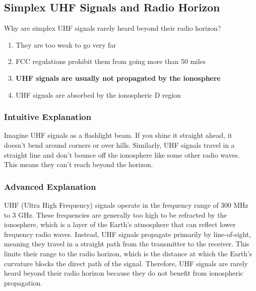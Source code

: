 \subsection{Simplex UHF Signals and Radio Horizon}
\label{T3C01}

\begin{tcolorbox}[colback=gray!10!white,colframe=black!75!black,title=T3C01]
Why are simplex UHF signals rarely heard beyond their radio horizon?
\begin{enumerate}[noitemsep]
    \item They are too weak to go very far
    \item FCC regulations prohibit them from going more than 50 miles
    \item \textbf{UHF signals are usually not propagated by the ionosphere}
    \item UHF signals are absorbed by the ionospheric D region
\end{enumerate}
\end{tcolorbox}

\subsubsection*{Intuitive Explanation}
Imagine UHF signals as a flashlight beam. If you shine it straight ahead, it doesn't bend around corners or over hills. Similarly, UHF signals travel in a straight line and don't bounce off the ionosphere like some other radio waves. This means they can't reach beyond the horizon.

\subsubsection*{Advanced Explanation}
UHF (Ultra High Frequency) signals operate in the frequency range of 300 MHz to 3 GHz. These frequencies are generally too high to be refracted by the ionosphere, which is a layer of the Earth's atmosphere that can reflect lower frequency radio waves. Instead, UHF signals propagate primarily by line-of-sight, meaning they travel in a straight path from the transmitter to the receiver. This limits their range to the radio horizon, which is the distance at which the Earth's curvature blocks the direct path of the signal. Therefore, UHF signals are rarely heard beyond their radio horizon because they do not benefit from ionospheric propagation.